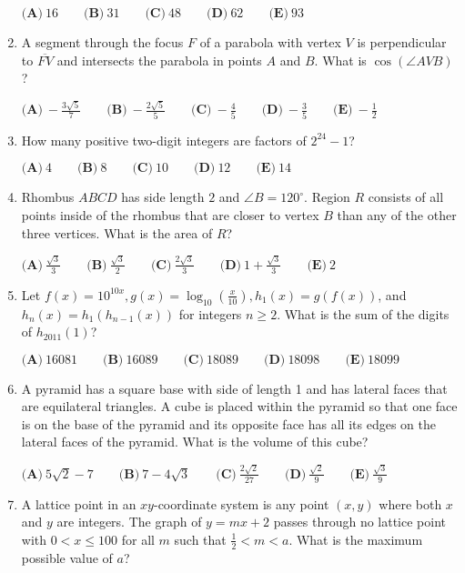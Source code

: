 \documentclass{article}
\begin{document}
\begin{enumerate}[label=\arabic*., itemsep=0.5em]
$\textbf{(A)}\ 16 \qquad \textbf{(B)}\ 31 \qquad \textbf{(C)}\ 48 \qquad \textbf{(D)}\ 62 \qquad \textbf{(E)}\ 93$\par \vspace{0.5em}\item A segment through the focus $F$ of a parabola with vertex $V$ is perpendicular to $\overline{FV}$ and intersects the parabola in points $A$ and $B$. What is $\cos\left(\angle AVB\right)$?

$\textbf{(A)}\ -\frac{3\sqrt{5}}{7} \qquad \textbf{(B)}\ -\frac{2\sqrt{5}}{5} \qquad \textbf{(C)}\ -\frac{4}{5} \qquad \textbf{(D)}\ -\frac{3}{5} \qquad \textbf{(E)}\ -\frac{1}{2}$\par \vspace{0.5em}\item How many positive two-digit integers are factors of $2^{24}-1$?

$\textbf{(A)}\ 4 \qquad \textbf{(B)}\ 8 \qquad \textbf{(C)}\ 10 \qquad \textbf{(D)}\ 12 \qquad \textbf{(E)}\ 14$\par \vspace{0.5em}\item Rhombus $ABCD$ has side length $2$ and $\angle B = 120^{\circ}$. Region $R$ consists of all points inside of the rhombus that are closer to vertex $B$ than any of the other three vertices. What is the area of $R$?

$\textbf{(A)}\ \frac{\sqrt{3}}{3} \qquad \textbf{(B)}\ \frac{\sqrt{3}}{2} \qquad \textbf{(C)}\ \frac{2\sqrt{3}}{3} \qquad \textbf{(D)}\ 1 + \frac{\sqrt{3}}{3} \qquad \textbf{(E)}\ 2$\par \vspace{0.5em}\item Let $f(x) = 10^{10x}, g(x) = \log_{10}\left(\frac{x}{10}\right), h_1(x) = g(f(x))$, and $h_n(x) = h_1(h_{n-1}(x))$ for integers $n \geq 2$. What is the sum of the digits of $h_{2011}(1)$?

$\textbf{(A)}\ 16081 \qquad \textbf{(B)}\ 16089 \qquad \textbf{(C)}\ 18089 \qquad \textbf{(D)}\ 18098 \qquad \textbf{(E)}\ 18099$\par \vspace{0.5em}\item A pyramid has a square base with side of length 1 and has lateral faces that are equilateral triangles. A cube is placed within the pyramid so that one face is on the base of the pyramid and its opposite face has all its edges on the lateral faces of the pyramid. What is the volume of this cube?

$\textbf{(A)}\ 5\sqrt{2} - 7 \qquad \textbf{(B)}\ 7 - 4\sqrt{3} \qquad \textbf{(C)}\ \frac{2\sqrt{2}}{27} \qquad \textbf{(D)}\ \frac{\sqrt{2}}{9} \qquad \textbf{(E)}\ \frac{\sqrt{3}}{9}$\par \vspace{0.5em}\item A lattice point in an $xy$-coordinate system is any point $(x, y)$ where both $x$ and $y$ are integers. The graph of $y = mx + 2$ passes through no lattice point with $0 < x \leq 100$ for all $m$ such that $\frac{1}{2} < m < a$. What is the maximum possible value of $a$?


\end{enumerate}
\end{document}
